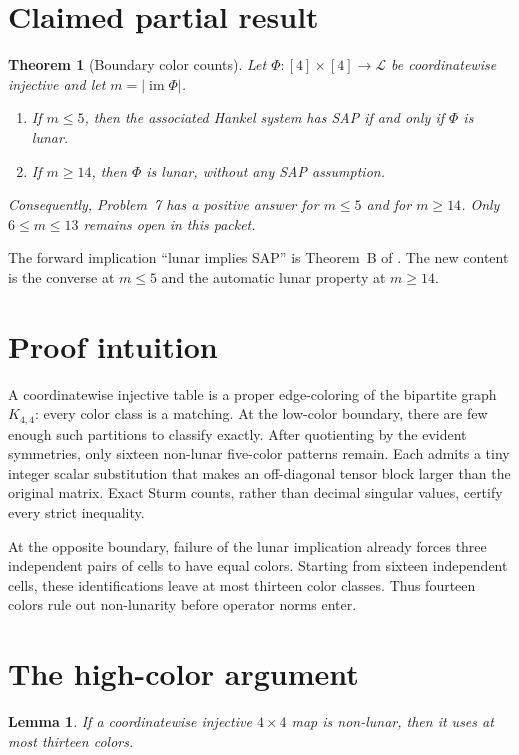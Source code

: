 \documentclass[11pt]{article}
\newtheorem{theorem}{Theorem}
\newtheorem{lemma}{Lemma}
\newcommand{\im}{\operatorname{im}}
\begin{document}
\section{Claimed partial result}

\begin{theorem}[Boundary color counts]\label{thm:main}
Let $\Phi:[4]\times[4]\to\mathcal L$ be coordinatewise injective and let
$m=|\im\Phi|$.
\begin{enumerate}
\item If $m\leq5$, then the associated Hankel system has SAP if and only if
$\Phi$ is lunar.
\item If $m\geq14$, then $\Phi$ is lunar, without any SAP assumption.
\end{enumerate}
Consequently, Problem~7 has a positive answer for $m\leq5$ and for
$m\geq14$.  Only $6\leq m\leq13$ remains open in this packet.
\end{theorem}

The forward implication ``lunar implies SAP'' is Theorem~B of
\cite{HanQiuWang2024}.  The new content is the converse at $m\leq5$ and the
automatic lunar property at $m\geq14$.

\section{Proof intuition}

A coordinatewise injective table is a proper edge-coloring of the bipartite
graph $K_{4,4}$: every color class is a matching.  At the low-color boundary,
there are few enough such partitions to classify exactly.  After quotienting
by the evident symmetries, only sixteen non-lunar five-color patterns remain.
Each admits a tiny integer scalar substitution that makes an off-diagonal
tensor block larger than the original matrix.  Exact Sturm counts, rather
than decimal singular values, certify every strict inequality.

At the opposite boundary, failure of the lunar implication already forces
three independent pairs of cells to have equal colors.  Starting from sixteen
independent cells, these identifications leave at most thirteen color classes.
Thus fourteen colors rule out non-lunarity before operator norms enter.

\section{The high-color argument}

\begin{lemma}\label{lem:high}
If a coordinatewise injective $4\times4$ map is non-lunar, then it uses at
most thirteen colors.
\end{lemma}
\end{document}
